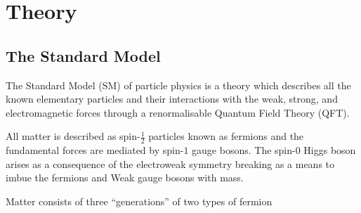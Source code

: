 \chapter{Theory}\label{chapter:theory}
\section{The Standard Model}\label{sec:sm}
The Standard Model (SM) of particle physics is a theory which describes all the known elementary particles and their interactions with the weak, strong, and electromagnetic forces through a renormalisable Quantum Field Theory (QFT).

All matter is described as spin-$\frac{1}{2}$ particles known as fermions and the fundamental forces are mediated by spin-$1$ gauge bosons.
The spin-$0$ Higgs boson arises as a consequence of the electroweak symmetry breaking as a means to imbue the fermions and Weak gauge bosons with mass.

Matter consists of three ``generations''  of two types of fermion

